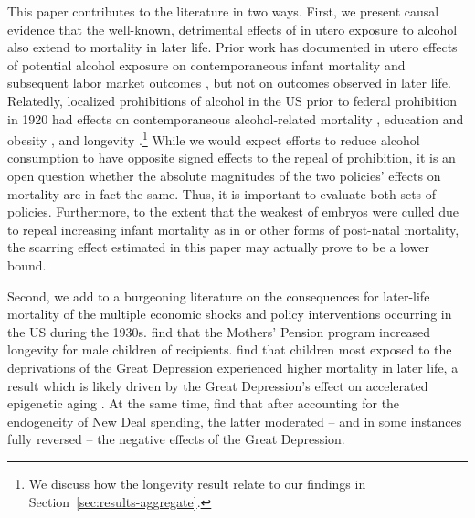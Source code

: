 \documentclass[12pt]{article}
\begin{document}
This paper contributes to the literature in two ways. 
First, we present causal evidence that the well-known, detrimental effects of in utero exposure to alcohol also extend to mortality in later life. 
Prior work has documented in utero effects of potential alcohol exposure on contemporaneous infant mortality  and subsequent labor market outcomes , but not on outcomes observed in later life.
Relatedly, localized prohibitions of alcohol in the US prior to federal prohibition in 1920 had effects on contemporaneous alcohol-related mortality , education and obesity , and longevity .\footnote{We discuss how the  longevity result relate to our findings in Section~\ref{sec:results-aggregate}.}
While we would expect efforts to reduce alcohol consumption to have opposite signed effects to the repeal of prohibition, it is an open question whether the absolute magnitudes of the two policies’ effects on mortality are in fact the same. 
Thus, it is important to evaluate both sets of policies. 
Furthermore, to the extent that the weakest of embryos were culled due to repeal increasing infant mortality as in  or other forms of post-natal mortality, the scarring effect estimated in this paper may actually prove to be a lower bound.

Second, we add to a burgeoning literature on the consequences for later-life mortality of the multiple economic shocks and policy interventions occurring in the US during the 1930s. 
 find that the Mothers' Pension program increased longevity for male children of recipients. 
 find that children most exposed to the deprivations of the Great Depression experienced higher mortality in later life, a result which is likely driven by the Great Depression's effect on accelerated epigenetic aging . 
At the same time,  find that after accounting for the endogeneity of New Deal spending, the latter moderated -- and in some instances fully reversed -- the negative effects of the Great Depression. 
\end{document}
